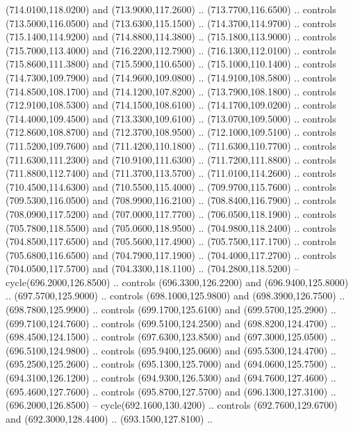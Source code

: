 {\begin{scope}[y=0.80pt, x=0.80pt, yscale=-1, xscale=1, inner sep=0pt, outer sep=0pt, #1]
      (714.0100,118.0200) and (713.9000,117.2600) .. (713.7700,116.6500) .. controls
      (713.5000,116.0500) and (713.6300,115.1500) .. (714.3700,114.9700) .. controls
      (715.1400,114.9200) and (714.8800,114.3800) .. (715.1800,113.9000) .. controls
      (715.7000,113.4000) and (716.2200,112.7900) .. (716.1300,112.0100) .. controls
      (715.8600,111.3800) and (715.5900,110.6500) .. (715.1000,110.1400) .. controls
      (714.7300,109.7900) and (714.9600,109.0800) .. (714.9100,108.5800) .. controls
      (714.8500,108.1700) and (714.1200,107.8200) .. (713.7900,108.1800) .. controls
      (712.9100,108.5300) and (714.1500,108.6100) .. (714.1700,109.0200) .. controls
      (714.4000,109.4500) and (713.3300,109.6100) .. (713.0700,109.5000) .. controls
      (712.8600,108.8700) and (712.3700,108.9500) .. (712.1000,109.5100) .. controls
      (711.5200,109.7600) and (711.4200,110.1800) .. (711.6300,110.7700) .. controls
      (711.6300,111.2300) and (710.9100,111.6300) .. (711.7200,111.8800) .. controls
      (711.8800,112.7400) and (711.3700,113.5700) .. (711.0100,114.2600) .. controls
      (710.4500,114.6300) and (710.5500,115.4000) .. (709.9700,115.7600) .. controls
      (709.5300,116.0500) and (708.9900,116.2100) .. (708.8400,116.7900) .. controls
      (708.0900,117.5200) and (707.0000,117.7700) .. (706.0500,118.1900) .. controls
      (705.7800,118.5500) and (705.0600,118.9500) .. (704.9800,118.2400) .. controls
      (704.8500,117.6500) and (705.5600,117.4900) .. (705.7500,117.1700) .. controls
      (705.6800,116.6500) and (704.7900,117.1900) .. (704.4000,117.2700) .. controls
      (704.0500,117.5700) and (704.3300,118.1100) .. (704.2800,118.5200) --
      cycle(696.2000,126.8500) .. controls (696.3300,126.2200) and
      (696.9400,125.8000) .. (697.5700,125.9000) .. controls (698.1000,125.9800) and
      (698.3900,126.7500) .. (698.7800,125.9900) .. controls (699.1700,125.6100) and
      (699.5700,125.2900) .. (699.7100,124.7600) .. controls (699.5100,124.2500) and
      (698.8200,124.4700) .. (698.4500,124.1500) .. controls (697.6300,123.8500) and
      (697.3000,125.0500) .. (696.5100,124.9800) .. controls (695.9400,125.0600) and
      (695.5300,124.4700) .. (695.2500,125.2600) .. controls (695.1300,125.7000) and
      (694.0600,125.7500) .. (694.3100,126.1200) .. controls (694.9300,126.5300) and
      (694.7600,127.4600) .. (695.4600,127.7600) .. controls (695.8700,127.5700) and
      (696.1300,127.3100) .. (696.2000,126.8500) -- cycle(692.1600,130.4200) ..
      controls (692.7600,129.6700) and (692.3000,128.4400) .. (693.1500,127.8100) ..

\end{scope}}
